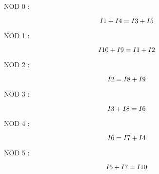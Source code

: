 \documentclass[12pt,twoside]{report}
\numberwithin{figure}{section}
\begin{document}
		{\large NOD 0 :}
		
		\begin{equation}
		I\small{1} + I\small{4} = I\small{3} + I\small{5}
		\vspace{0.5cm}
		\end{equation}
		
		{\large NOD 1 :}
		
		\begin{equation}
		I\small{10} + I\small{9} = I\small{1} + I\small{2}
		\vspace{0.5cm}
		\end{equation}
		
		
			
		{\large NOD 2 :}
		
		\begin{equation}
		I\small{2} = I\small{8} + I\small{9}
		\vspace{0.5cm}
		\end{equation}
	
		
			
		{\large NOD 3 :}
		
		\begin{equation}
		I\small{3} + I\small{8} = I\small{6}
		\vspace{0.5cm}
		\end{equation}
		
			
		{\large NOD 4 :}
		
		\begin{equation}
		I\small{6} = I\small{7} + I\small{4}
		\vspace{0.5cm}
		\end{equation}
		
		
			
		{\large NOD 5 :}
		
		\begin{equation}
		I\small{5} + I\small{7} = I\small{10}
		\vspace{0.5cm}
		\end{equation}
		
		
\end{document}
